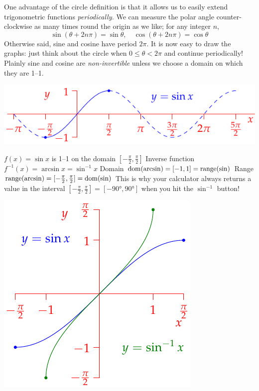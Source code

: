 One advantage of the circle definition is that it allows us to easily extend trigonometric functions \emph{periodically.} We can measure the polar angle counter-clockwise as many times round the origin as we like; for any integer $n$,
\[
	\sin(\theta+2n\pi)=\sin\theta,\quad \cos(\theta+2n\pi)=\cos\theta
\]
Otherwise said, sine and cosine have period $2\pi$. It is now easy to draw the graphs: just think about the circle when $0\le \theta<2\pi$ and continue periodically! Plainly sine and cosine are \emph{non-invertible} unless we choose a domain on which they are 1--1.\par
\begin{minipage}[t]{0.6\textwidth}\vspace{-3pt}
	\includegraphics[scale=0.95]{invsine2}\par
	$f(x)=\sin x$ is 1--1 on the domain $[-\frac\pi 2,\frac\pi 2]$\smallbreak
	Inverse function $f^{-1}(x)=\arcsin x=\sin^{-1}x$\smallbreak
	Domain $\operatorname{dom}(\arcsin)=[-1,1] =\operatorname{range}(\sin)$\smallbreak
	Range $\operatorname{range}(\arcsin)=[-\frac\pi 2,\frac\pi 2]=\operatorname{dom}(\sin)$\medbreak
	This is why your calculator always returns a value in the interval $[-\frac\pi 2,\frac\pi 2]=[-\ang{90},\ang{90}]$ when you hit the $\sin^{-1}$ button!
\end{minipage}
\hfill
\begin{minipage}[t]{0.39\textwidth}\vspace{-5pt}
	\flushright\includegraphics[scale=0.93]{invsine}
\end{minipage}


